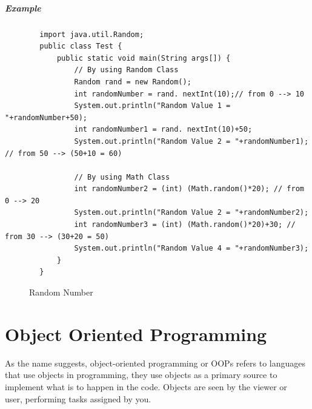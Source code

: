 \documentclass[openany]{book}  %
\begin{document}
\subsubsection{Example}
\begin{center}
    \footnotesize
    \begin{verbatim}
        import java.util.Random;
        public class Test {
            public static void main(String args[]) {
                // By using Random Class
                Random rand = new Random();
                int randomNumber = rand. nextInt(10);// from 0 --> 10
                System.out.println("Random Value 1 = "+randomNumber+50);
                int randomNumber1 = rand. nextInt(10)+50;
                System.out.println("Random Value 2 = "+randomNumber1); // from 50 --> (50+10 = 60)

                // By using Math Class
                int randomNumber2 = (int) (Math.random()*20); // from 0 --> 20
                System.out.println("Random Value 2 = "+randomNumber2); 
                int randomNumber3 = (int) (Math.random()*20)+30; // from 30 --> (30+20 = 50)
                System.out.println("Random Value 4 = "+randomNumber3); 
            }
        }
    \end{verbatim}
\end{center}
% 
% 
\begin{figure}[htbp]
    \begin{center}
        \caption{Random Number}
    \end{center}
\end{figure}

% 
% 
\part{Object Oriented Programming}
\vspace*{\fill}
As the name suggests, object-oriented programming or OOPs refers to languages
that use objects in programming, they use objects as a primary source to \\
implement what is to happen in the code. Objects are seen by the viewer or \\
user, performing tasks assigned by you.
\vspace*{\fill}
\end{document}
